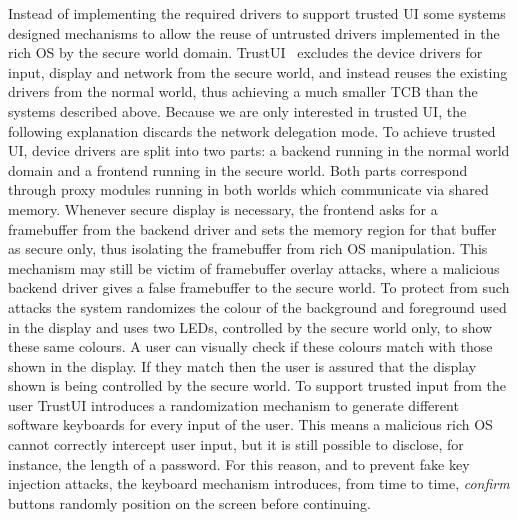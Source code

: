 Instead of implementing the required drivers to support trusted UI some systems designed mechanisms to allow the reuse of untrusted drivers implemented in the rich OS by the secure world domain.
TrustUI~\cite{li2014building} excludes the device drivers for input, display and network from the secure world, and instead reuses the existing drivers from the normal world, thus achieving a much smaller TCB than the systems described above. Because we are only interested in trusted UI, the following explanation discards the network delegation mode. To achieve trusted UI, device drivers are split into two parts: a backend running in the normal world domain and a frontend running in the secure world. Both parts correspond through proxy modules running in both worlds which communicate via shared memory. Whenever secure display is necessary, the frontend asks for a framebuffer from the backend driver and sets the memory region for that buffer as secure only, thus isolating the framebuffer from rich OS manipulation. This mechanism may still be victim of framebuffer overlay attacks, where a malicious backend driver gives a false framebuffer to the secure world. To protect from such attacks the system randomizes the colour of the background and foreground used in the display and uses two LEDs, controlled by the secure world only, to show these same colours. A user can visually check if these colours match with those shown in the display. If they match then the user is assured that the display shown is being controlled by the secure world. To support trusted input from the user TrustUI introduces a randomization mechanism to generate different software keyboards for every input of the user. This means a malicious rich OS cannot correctly intercept user input, but it is still possible to disclose, for instance, the length of a password. For this reason, and to prevent fake key injection attacks, the keyboard mechanism introduces, from time to time, \emph{confirm} buttons randomly position on the screen before continuing.


